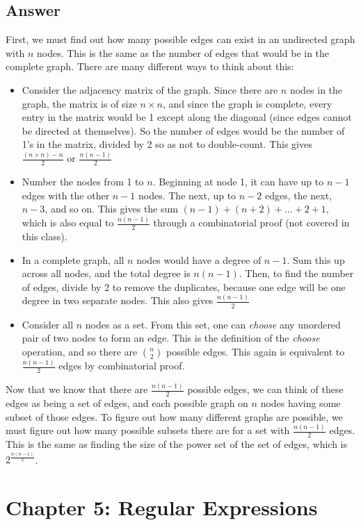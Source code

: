 \documentclass{article}
\begin{document}
\subsection*{Answer}
First, we must find out how many possible edges can exist in an undirected graph with $n$ nodes. This is the same as the number of edges that would be in the complete graph. There are many different ways to think about this:
\begin{itemize}
    \item Consider the adjacency matrix of the graph. Since there are $n$ nodes in the graph, the matrix is of size $n\times n$, and since the graph is complete, every entry in the matrix would be 1 except along the diagonal (since edges cannot be directed at themselves). So the number of edges would be the number of 1's in the matrix, divided by 2 so as not to double-count. This gives $\frac{(n\times n)-n}{2}$ or $\frac{n(n-1)}{2}$
    \item Number the nodes from 1 to $n$. Beginning at node 1, it can have up to $n-1$ edges with the other $n-1$ nodes. The next, up to $n-2$ edges, the next, $n-3$, and so on. This gives the sum $(n-1)+(n+2)+...+2+1$, which is also equal to $\frac{n(n-1)}{2}$ through a combinatorial proof (not covered in this class).
    \item In a complete graph, all $n$ nodes would have a degree of $n-1$. Sum this up across all nodes, and the total degree is $n(n-1)$. Then, to find the number of edges, divide by 2 to remove the duplicates, because one edge will be one degree in two separate nodes. This also gives $\frac{n(n-1)}{2}$
    \item Consider all $n$ nodes as a set. From this set, one can \textit{choose} any unordered pair of two nodes to form an edge. This is the definition of the \textit{choose} operation, and so there are $n\choose 2$ possible edges. This again is equivalent to $\frac{n(n-1)}{2}$ edges by combinatorial proof.
\end{itemize}
Now that we know that there are $\frac{n(n-1)}{2}$ possible edges, we can think of these edges as being a set of edges, and each possible graph on $n$ nodes having some subset of those edges. To figure out how many different graphs are possible, we must figure out how many possible subsets there are for a set with $\frac{n(n-1)}{2}$ edges. This is the same as finding the size of the power set of the set of edges, which is $2^{\frac{n(n-1)}{2}}$.
\newpage
\section*{Chapter 5: Regular Expressions}
\end{document}
